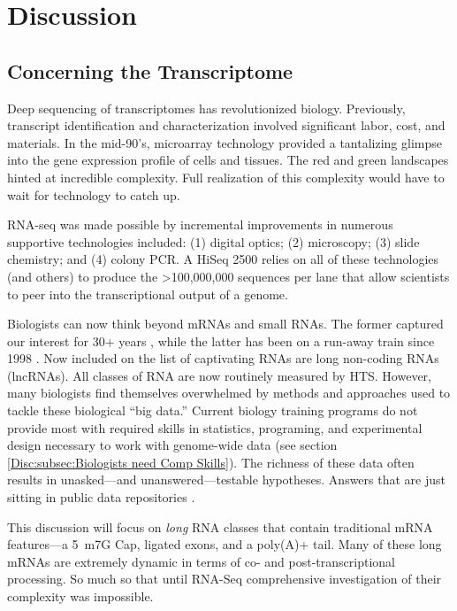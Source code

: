 \chapter{Discussion} 
\label{Disc}
\section{Concerning the Transcriptome}
  \label{Disc:sec:Future of Dynamic long RNAs}

  Deep sequencing of transcriptomes has revolutionized biology. Previously, transcript identification and characterization involved significant labor, cost, and materials. In the mid-90's, microarray technology \citep{Schena1995a} provided a tantalizing glimpse into the gene expression profile of cells and tissues. The red and green landscapes hinted at incredible complexity. Full realization of this complexity would have to wait for technology to catch up.

  RNA-seq was made possible by incremental improvements in numerous supportive technologies included: (1) digital optics; (2) microscopy; (3) slide chemistry; and (4) colony PCR. A HiSeq 2500 relies on all of these technologies (and others) to produce the >100,000,000 sequences per lane that allow scientists to peer into the transcriptional output of a genome.

  Biologists can now think beyond mRNAs and small RNAs. The former captured our interest for 30+ years \citep{Furuichi1975,Wei1975}, while the latter has been on a run-away train since 1998 \citep{Fire1998}. Now included on the list of captivating RNAs are long non-coding RNAs (lncRNAs). All classes of RNA are now routinely measured by HTS. However, many biologists find themselves overwhelmed by methods and approaches used to tackle these biological ``big data.'' Current biology training programs do not provide most with required skills in statistics, programing, and experimental design necessary to work with genome-wide data (see section \ref{Disc:subsec:Biologists need Comp Skills}). The richness of these data often results in unasked---and unanswered---testable hypotheses. Answers that are just sitting in public data repositories \citep{Plocik2013}.

  This discussion will focus on \textit{long} RNA classes that contain traditional mRNA features---a 5\textprime~m7G Cap, ligated exons, and a poly(A)+ tail. Many of these long mRNAs are extremely dynamic in terms of co- and post-transcriptional processing. So much so that until RNA-Seq comprehensive investigation of their complexity was impossible.

